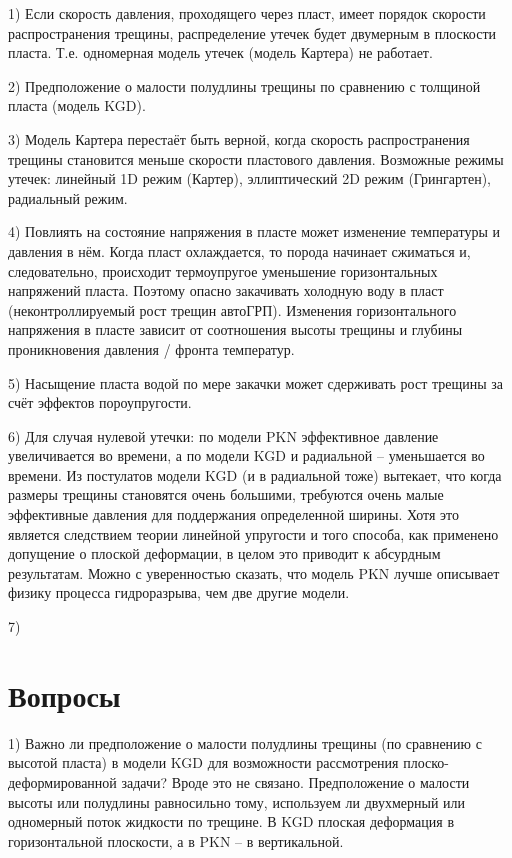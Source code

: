 \documentclass[a4paper, 12pt]{article}
\begin{document}
1) Если скорость давления, проходящего через пласт, имеет порядок скорости распространения трещины, распределение утечек будет двумерным в плоскости пласта. Т.е. одномерная модель утечек (модель Картера) не работает.

2) Предположение о малости полудлины трещины по сравнению с толщиной пласта (модель KGD).

3) Модель Картера перестаёт быть верной, когда скорость распространения трещины становится меньше скорости пластового давления.
Возможные режимы утечек: линейный 1D режим (Картер), эллиптический 2D режим (Грингартен), радиальный режим.

4) Повлиять на состояние напряжения в пласте может изменение температуры и давления в нём.
Когда пласт охлаждается, то порода начинает сжиматься и, следовательно, происходит термоупругое уменьшение горизонтальных напряжений пласта.
Поэтому опасно закачивать холодную воду в пласт (неконтроллируемый рост трещин автоГРП).
Изменения горизонтального напряжения в пласте зависит от соотношения высоты трещины и глубины проникновения давления / фронта температур.

5) Насыщение пласта водой по мере закачки может сдерживать рост трещины за счёт эффектов пороупругости.

6) Для случая нулевой утечки: по модели PKN эффективное давление увеличивается во времени, а по модели KGD и радиальной -- уменьшается во времени.
Из постулатов модели KGD (и в радиальной тоже) вытекает, что когда размеры трещины становятся очень большими, требуются очень малые эффективные давления для поддержания определенной ширины.
Хотя это является следствием теории линейной упругости и того способа, как применено допущение о плоской деформации, в целом это приводит к абсурдным результатам.
Можно с уверенностью сказать, что модель PKN лучше описывает физику процесса гидроразрыва, чем две другие модели.

7)
\\

\section{Вопросы}

1) Важно ли предположение о малости полудлины трещины (по сравнению с высотой пласта) в модели KGD для возможности рассмотрения плоско-деформированной задачи?
Вроде это не связано.
Предположение о малости высоты или полудлины равносильно тому, используем ли двухмерный или одномерный поток жидкости по трещине.
В KGD плоская деформация в горизонтальной плоскости, а в PKN -- в вертикальной.
\end{document}
